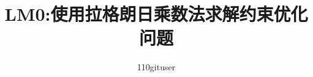 

% 


\documentclass[12pt]{ctexart} 

\usepackage{amsmath, amssymb}   %
\usepackage{graphicx}           %
\usepackage{geometry}           %
\usepackage{tikz}               %
\usepackage{caption}            %


\geometry{a4paper, margin=1in}
\title{LM0:使用拉格朗日乘数法求解约束优化问题}
\author{110gituser}
\date{}



\maketitle

\section{问题描述}

本问题的目标是在单位圆约束下，最小化一个二维函数：
\[
\min_{x_1, x_2} \quad f(x_1, x_2) = x_1^2 + 2x_2
\]
约束条件为：
\[
g(x_1, x_2) = x_1^2 + x_2^2 - 1 = 0
\]
该约束表示解必须在单位圆上。

\section{拉格朗日乘数法原理}

拉格朗日乘数法是一种用于求解带等式约束的最优化问题的方法。其基本思想是：若函数 \( f(x_1, x_2) \) 在约束 \( g(x_1, x_2) = 0 \) 下有极值，则在极值点处，目标函数的梯度 \( \nabla f \) 与约束函数的梯度 \( \nabla g \) 必须共线，即存在一个实数 \( \lambda \)，使得：
\[
\nabla f(x_1, x_2) = \lambda \nabla g(x_1, x_2)
\]

